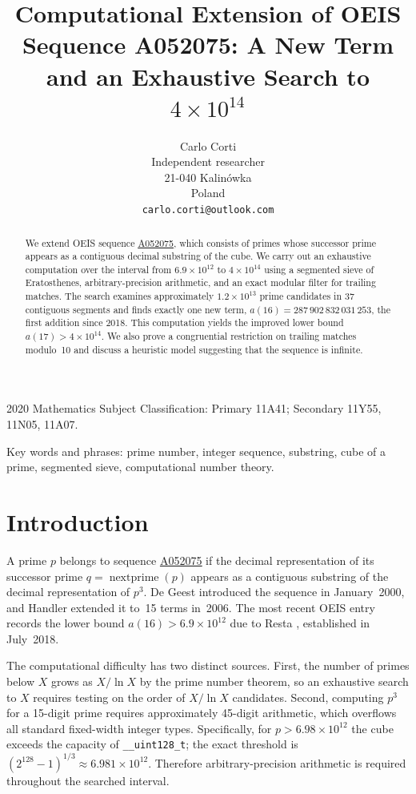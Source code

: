 \documentclass[12pt,reqno]{article}
\title{Computational Extension of OEIS Sequence A052075:
A New Term and an Exhaustive Search to $4 \times 10^{14}$}
\author{
Carlo Corti\\
Independent researcher\\
21-040 Kalin\'owka\\
Poland\\
\texttt{carlo.corti@outlook.com}
}
\date{}
\theoremstyle{plain}
\theoremstyle{definition}
\theoremstyle{remark}
\newcommand{\np}{\operatorname{nextprime}}
\newcommand{\seqnum}[1]{\href{https://oeis.org/#1}{\rm \underline{#1}}}
\begin{document}
\maketitle

\begin{abstract}
We extend OEIS sequence \seqnum{A052075}, which consists of primes whose
successor prime appears as a contiguous decimal substring of the cube.
We carry out an exhaustive computation over the interval from
$6.9 \times 10^{12}$ to $4 \times 10^{14}$ using a segmented sieve of
Eratosthenes, arbitrary-precision arithmetic, and an exact modular
filter for trailing matches.
The search examines approximately $1.2 \times 10^{13}$ prime candidates
in 37 contiguous segments and finds exactly one new term,
$a(16) = 287\,902\,832\,031\,253$, the first addition since 2018.
This computation yields the improved lower bound
$a(17) > 4 \times 10^{14}$.
We also prove a congruential restriction on trailing matches modulo~10
and discuss a heuristic model suggesting that the sequence is infinite.
\end{abstract}

2020 Mathematics Subject Classification: Primary 11A41;
Secondary 11Y55, 11N05, 11A07.

Key words and phrases: prime number, integer sequence,
substring, cube of a prime, segmented sieve, computational number
theory.

\section{Introduction}
\label{sec:intro}

A prime $p$ belongs to sequence \seqnum{A052075} if the decimal
representation of its successor prime $q = \np(p)$ appears as a
contiguous substring of the decimal representation of $p^3$.
De Geest \cite{DeGeest2000} introduced the sequence in January~2000,
and Handler \cite{Handler2006} extended it to~15 terms in~2006.
The most recent OEIS entry \cite{OEIS_A052075} records the lower bound
$a(16) > 6.9 \times 10^{12}$ due to Resta \cite{Resta2018},
established in July~2018.

The computational difficulty has two distinct sources.
First, the number of primes below $X$ grows as $X / \ln X$ by the
prime number theorem, so an exhaustive search to $X$ requires testing
on the order of $X / \ln X$ candidates.
Second, computing $p^3$ for a 15-digit prime requires approximately
45-digit arithmetic, which overflows all standard fixed-width integer
types.
Specifically, for $p > 6.98 \times 10^{12}$ the cube exceeds the
capacity of \texttt{\_\_uint128\_t}; the exact threshold is
$(2^{128} - 1)^{1/3} \approx 6.981 \times 10^{12}$.
Therefore arbitrary-precision arithmetic is required throughout
the searched interval.
\end{document}
